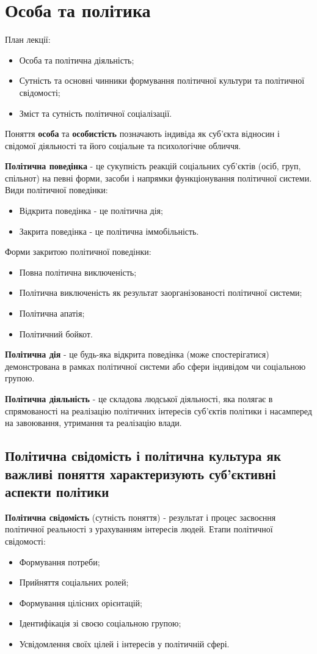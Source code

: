 \section{Особа та політика} 
План лекції:
\begin{itemize}
\item Особа та політична діяльність;
\item Сутність та основні чинники формування політичної культури та політичної свідомості;
\item Зміст та сутність політичної соціалізації.
\end{itemize}
Поняття \textbf{особа} та \textbf{особистість} позначають індивіда як суб’єкта відносин і свідомої діяльності та його соціальне та психологічне обличчя.

\textbf{Політична поведінка} - це сукупність реакцій соціальних суб’єктів (осіб, груп, спільнот) на певні форми, засоби і напрямки функціонування політичної системи.
Види політичної поведінки:
\begin{itemize}
\item Відкрита поведінка - це політична дія;
\item Закрита поведінка - це політична іммобільність.
\end{itemize}
Форми закритою політичної поведінки:
\begin{itemize}
\item Повна політична виключеність;
\item Політична виключеність як результат заорганізованості політичної системи;
\item Політична апатія;
\item Політичний бойкот.
\end{itemize}

\textbf{Політична дія} - це будь-яка відкрита поведінка (може спостерігатися) демонстрована в рамках політичної системи або сфери індивідом чи соціальною групою.

\textbf{Політична діяльність} - це складова людської діяльності, яка полягає в спрямованості на реалізацію політичних інтересів суб’єктів політики і насамперед на завоювання, утримання та реалізацію влади.

\subsection{Політична свідомість і політична культура як важливі поняття характеризують суб’єктивні аспекти політики}
\textbf{Політична свідомість} (сутність поняття) - результат і процес засвоєння політичної реальності з урахуванням інтересів людей.
Етапи політичної свідомості:
\begin{itemize}
\item Формування потреби;
\item Прийняття соціальних ролей;
\item Формування цілісних орієнтацій;
\item Ідентифікація зі своєю соціальною групою;
\item Усвідомлення своїх цілей і інтересів у політичній сфері.
\end{itemize}

